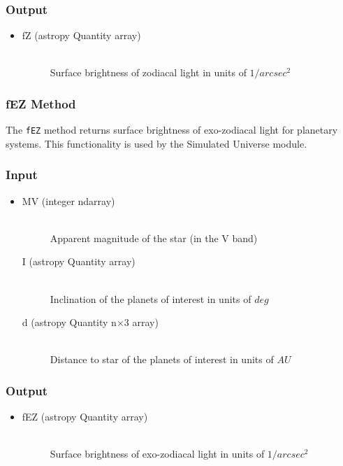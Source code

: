\documentclass[cleanfoot]{asme2ej}
\begin{document}
\subsubsection*{Output}
\begin{itemize}
\item 
\begin{description}
    \item[fZ (astropy Quantity array)] \hfill \\ Surface brightness of zodiacal light in units of $ 1/arcsec^2 $
\end{description}
\end{itemize}

\subsubsection{fEZ Method} \label{sec:fEZtask}
The \verb+fEZ+ method returns surface brightness of exo-zodiacal light for planetary systems.  This functionality is used by the Simulated Universe module.

\subsubsection*{Input}
\begin{itemize}
\item 
\begin{description}
    \item[MV (integer ndarray)] \hfill \\ Apparent magnitude of the star (in the V band)
    \item[I (astropy Quantity array)] \hfill \\ Inclination of the planets of interest in units of $ deg $
    \item[d (astropy Quantity n$\times$3 array)] \hfill \\ Distance to star of the planets of interest in units of $AU$
\end{description}
\end{itemize}

\subsubsection*{Output}
\begin{itemize}
\item 
\begin{description}
    \item[fEZ (astropy Quantity array)] \hfill \\ Surface brightness of exo-zodiacal light in units of $ 1/arcsec^2 $
\end{description}
\end{itemize}
\end{document}
